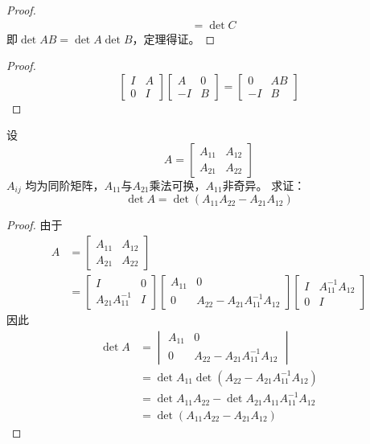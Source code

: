 \documentclass[twoside,openright]{book}
\begin{document}
\begin{CJK*}{UTF8}{}
\begin{proof}
\begin{align*}
         &=\det C
\end{align*}
即$\det AB=\det A \det B$，定理得证。
\end{proof}
\begin{proof}
\[
\begin{bmatrix}
I & A \\ 0 & I
\end{bmatrix}
\begin{bmatrix}
A & 0 \\ -I & B
\end{bmatrix}=
\begin{bmatrix}
0 & AB \\ -I & B
\end{bmatrix}
\]
\end{proof}

\begin{quest}
\label{quest:78}
设
\[
A =
\begin{bmatrix}
A_{11} & A_{12} \\
A_{21} & A_{22}
\end{bmatrix}
\]
$A_{ij}$ 均为同阶矩阵，$A_{11}$与$A_{21}$乘法可换，$A_{11}$非奇异。
求证：
\[
\det{A} = \det \left( A_{11} A_{22} - A_{21} A_{12} \right)
\]
\end{quest}
\begin{proof}
由于
\begin{align*}
A &=
\begin{bmatrix}
A_{11} & A_{12} \\
A_{21} & A_{22}
\end{bmatrix} \\
&=\begin{bmatrix}
I & 0 \\
A_{21}A_{11}^{-1} &I
\end{bmatrix}
\begin{bmatrix}
A_{11} & 0 \\
0      & A_{22}-A_{21}A_{11}^{-1}A_{12}
\end{bmatrix}
\begin{bmatrix}
I & A_{11}^{-1}A_{12} \\
0 & I
\end{bmatrix}
\end{align*}
因此
\[
\begin{aligned}
\det A&= \begin{vmatrix}A_{11} & 0 \\
0      & A_{22}-A_{21}A_{11}^{-1}A_{12}
\end{vmatrix}\\
&=\det A_{11}\det (A_{22}-A_{21}A_{11}^{-1}A_{12})\\
&=\det A_{11}A_{22}-\det A_{21}A_{11}A_{11}^{-1}A_{12}\\
&=\det ( A_{11} A_{22} - A_{21} A_{12})
\end{aligned}
\]
\end{proof}


\end{CJK*}
\end{document}
